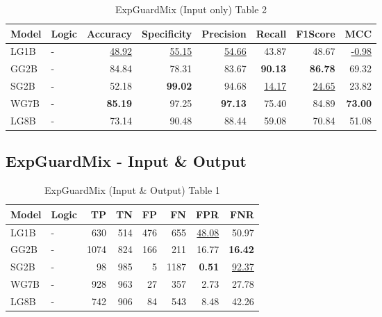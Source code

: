 \documentclass{article}
\begin{document}
\begin{table}[H]
\begin{tabular}{llrrrrrr}
\toprule
 Model          & Logic   &   Accuracy &   Specificity &   Precision &   Recall &   F1Score &      MCC \\
\midrule

 LG1B    & -       & \underline{48.92} & \underline{55.15} & \underline{54.66} & 43.87             & 48.67             & \underline{-0.98} \\
 GG2B    & -       & 84.84             & 78.31             & 83.67             & \textbf{90.13}    & \textbf{86.78}    & 69.32             \\
 SG2B    & -       & 52.18             & \textbf{99.02}    & 94.68             & \underline{14.17} & \underline{24.65} & 23.82             \\
 WG7B    & -       & \textbf{85.19}    & 97.25             & \textbf{97.13}    & 75.40             & 84.89             & \textbf{73.00}    \\
 LG8B    & -       & 73.14             & 90.48             & 88.44             & 59.08             & 70.84             & 51.08             \\

\bottomrule
\end{tabular}
\caption{\label{tab:xstest2}ExpGuardMix (Input only) Table 2}
\end{table}


\subsection{ExpGuardMix - Input \& Output}

\begin{table}[H]
\centering
\begin{tabular}{llrrrrrr}
\toprule
 Model          & Logic   &   TP &   TN &   FP &   FN &   FPR &   FNR \\
\midrule

 LG1B    & -       &  630 &  514 &  476 &  655 & \underline{48.08} & 50.97             \\
 GG2B    & -       & 1074 &  824 &  166 &  211 & 16.77             & \textbf{16.42}    \\
 SG2B    & -       &   98 &  985 &    5 & 1187 & \textbf{0.51}     & \underline{92.37} \\
 WG7B    & -       &  928 &  963 &   27 &  357 & 2.73              & 27.78             \\
 LG8B    & -       &  742 &  906 &   84 &  543 & 8.48              & 42.26             \\

\bottomrule
\end{tabular}
\caption{\label{tab:widgets}ExpGuardMix (Input \& Output) Table 1}
\end{table}
\end{document}
